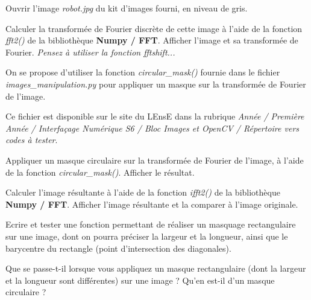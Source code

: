 \documentclass[a4paper,11pt,titlepage]{article} %
\begin{document}
\Manip Ouvrir l'image \textsl{robot.jpg} du kit d'images fourni, en niveau de gris.

\Manip Calculer la transformée de Fourier discrète de cette image à l'aide de la fonction \textsl{fft2()} de la bibliothèque \textbf{Numpy / FFT}. Afficher l'image et sa transformée de Fourier. \textit{Pensez à utiliser la fonction fftshift...}

\medskip

On se propose d'utiliser la fonction \textsl{circular\_mask()} fournie dans le fichier \textsl{images\_manipulation.py} pour appliquer un masque sur la transformée de Fourier de l'image. 

Ce fichier est disponible sur le site du LEnsE dans la rubrique \textit{Année / Première Année / Interfaçage Numérique S6 / Bloc Images et OpenCV / Répertoire vers codes à tester}.

\Manip Appliquer un masque circulaire sur la transformée de Fourier de l'image, à l'aide de la fonction \textsl{circular\_mask()}. Afficher le résultat.

\Manip Calculer l'image résultante à l'aide de la fonction \textit{ifft2()} de la bibliothèque \textbf{Numpy / FFT}. Afficher l'image résultante et la comparer à l'image originale.

\medskip

\Manip Ecrire et tester une fonction permettant de réaliser un masquage rectangulaire sur une image, dont on pourra préciser la largeur et la longueur, ainsi que le barycentre du rectangle (point d'intersection des diagonales).

\Quest Que se passe-t-il lorsque vous appliquez un masque rectangulaire (dont la largeur et la longueur sont différentes) sur une image ? Qu'en est-il d'un masque circulaire ?


\end{document}
